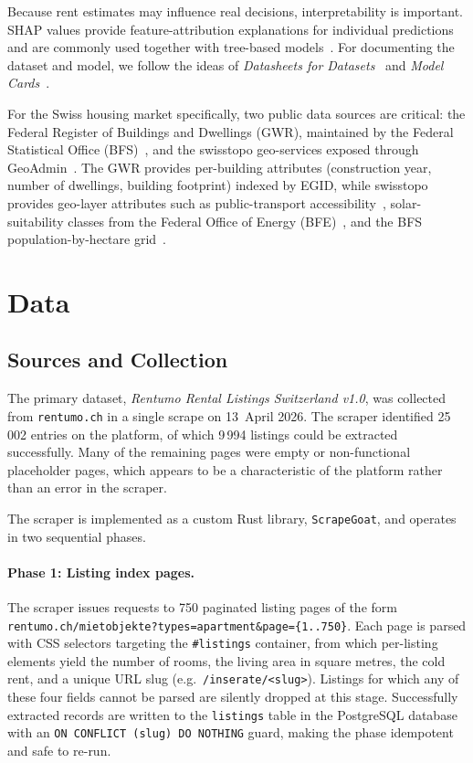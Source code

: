 \documentclass[11pt,a4paper]{article}
\begin{document}
Because rent estimates may influence real decisions, interpretability is important. SHAP values provide feature-attribution explanations for individual predictions and are commonly used together with tree-based models~\citep{lundberg2017shap}. For documenting the dataset and model, we follow the ideas of \emph{Datasheets for Datasets}~\citep{gebru2021datasheets} and \emph{Model Cards}~\citep{mitchell2019modelcards}.

For the Swiss housing market specifically, two public data sources are critical: the Federal Register of Buildings and Dwellings (GWR), maintained by the Federal Statistical Office (BFS)~\citep{bfsGwr}, and the swisstopo geo-services exposed through GeoAdmin~\citep{geoAdminApi}. The GWR provides per-building attributes (construction year, number of dwellings, building footprint) indexed by EGID, while swisstopo provides geo-layer attributes such as public-transport accessibility~\citep{areOevKlassen}, solar-suitability classes from the Federal Office of Energy (BFE)~\citep{bfeSolar}, and the BFS population-by-hectare grid~\citep{bfsPopulation}.

\section{Data}
\label{sec:data}

\subsection{Sources and Collection}
The primary dataset, \emph{Rentumo Rental Listings Switzerland v1.0}, was collected from \texttt{rentumo.ch} in a single scrape on 13~April 2026. The scraper identified 25\,002 entries on the platform, of which 9\,994 listings could be extracted successfully. Many of the remaining pages were empty or non-functional placeholder pages, which appears to be a characteristic of the platform rather than an error in the scraper.

The scraper is implemented as a custom Rust library, \texttt{ScrapeGoat}, and operates in two sequential phases.

\paragraph{Phase 1: Listing index pages.}
The scraper issues requests to 750 paginated listing pages of the form \texttt{rentumo.ch/mietobjekte?types=apartment\&page=\{1..750\}}. Each page is parsed with CSS selectors targeting the \texttt{\#listings} container, from which per-listing elements yield the number of rooms, the living area in square metres, the cold rent, and a unique URL slug (e.g.\ \texttt{/inserate/<slug>}). Listings for which any of these four fields cannot be parsed are silently dropped at this stage. Successfully extracted records are written to the \texttt{listings} table in the PostgreSQL database with an \texttt{ON CONFLICT (slug) DO NOTHING} guard, making the phase idempotent and safe to re-run.
\end{document}
